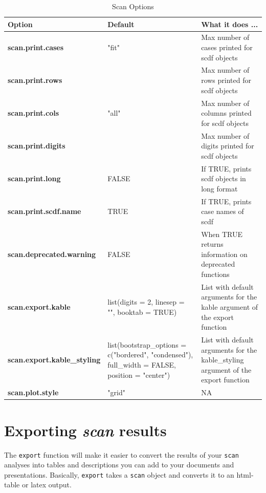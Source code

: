 \documentclass[
]{book}
\begin{document}
\begin{table}

\caption{\label{tab:table-options}Scan Options}
\centering
\begin{tabular}[t]{>{\raggedright\arraybackslash}p{15em}>{\raggedright\arraybackslash}p{15em}l}
\toprule
Option & Default & What it does ...\\
\midrule
\textbf{scan.print.cases} & "fit" & Max number of cases printed for scdf objects\\
\textbf{scan.print.rows} & 15 & Max number of rows printed for scdf objects\\
\textbf{scan.print.cols} & "all" & Max number of columns printed for scdf objects\\
\textbf{scan.print.digits} & 1 & Max number of digits printed for scdf objects\\
\textbf{scan.print.long} & FALSE & If TRUE, prints scdf objects in long format\\
\addlinespace
\textbf{scan.print.scdf.name} & TRUE & If TRUE, prints case names of scdf\\
\textbf{scan.deprecated.warning} & FALSE & When TRUE returns information on deprecated functions\\
\textbf{scan.export.kable} & list(digits = 2, linesep = "", booktab = TRUE) & List with default arguments for the kable argument of the export function\\
\textbf{scan.export.kable\_styling} & list(bootstrap\_options = c("bordered", "condensed"), full\_width = FALSE, position = "center") & List with default arguments for the kable\_styling argument of the export function\\
\textbf{scan.plot.style} & "grid" & NA\\
\bottomrule
\end{tabular}
\end{table}

\hypertarget{exporting-scan-results}{%
\chapter{\texorpdfstring{Exporting \emph{scan} results}{Exporting scan results}}\label{exporting-scan-results}}

The \texttt{export} function will make it easier to convert the results of your \texttt{scan} analyses into tables and descriptions you can add to your documents and presentations. Basically, \texttt{export} takes a \texttt{scan} object and converts it to an html-table or latex output.
\end{document}
